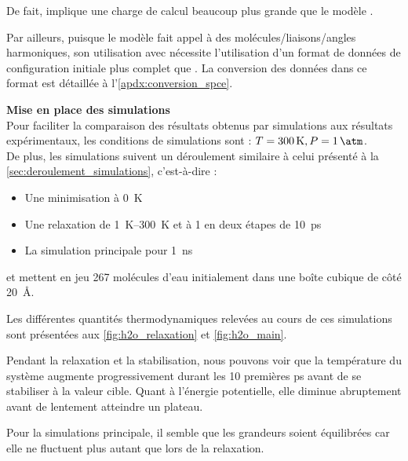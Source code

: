 De fait, \reaxff{} implique une charge de calcul beaucoup plus grande que le modèle \spce{}.

Par ailleurs, puisque le modèle \spce{} fait appel à des molécules/liaisons/angles harmoniques, son utilisation avec \lammps{} nécessite l'utilisation d'un format de données de configuration initiale plus complet que \reaxff{}. La conversion des données dans ce format est détaillée à l'\autoref{apdx:conversion_spce}.

\textbf{Mise en place des simulations}\\
Pour faciliter la comparaison des résultats obtenus par simulations aux résultats expérimentaux, les conditions de simulations sont : $T = \qty{300}{\kelvin}, P = \qty{1}{\atm}$.\\
De plus, les simulations suivent un déroulement similaire à celui présenté à la \autoref{sec:deroulement_simulations}, c'est-à-dire :
\begin{itemize}
    \item Une minimisation à \qty{0}{\kelvin}
    \item Une relaxation de \qtyrange{1}{300}{\kelvin} et à \qty{1}{\atm} en deux étapes de \qty{10}{\pico \second}
    \item La simulation principale pour \qty{1}{\nano \second}
\end{itemize}
et mettent en jeu \num{267} molécules d'eau initialement dans une boîte cubique de côté \qty{20}{\angstrom}.

Les différentes quantités thermodynamiques relevées au cours de ces simulations sont présentées aux \autoref{fig:h2o_relaxation} et \ref{fig:h2o_main}.

Pendant la relaxation et la stabilisation, nous pouvons voir que la température du système augmente progressivement durant les \num{10} premières \unit{\pico \second} avant de se stabiliser à la valeur cible. Quant à l'énergie potentielle, elle diminue abruptement avant de lentement atteindre un plateau.

Pour la simulations principale, il semble que les grandeurs soient équilibrées car elle ne fluctuent plus autant que lors de la relaxation.

